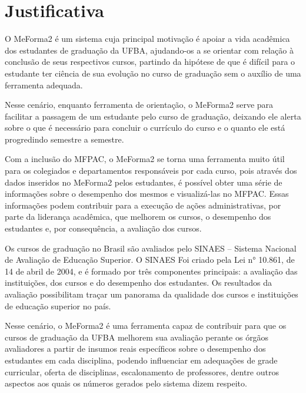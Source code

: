 \chapter{Justificativa}

O MeForma2 é um sistema cuja principal motivação é apoiar a vida acadêmica dos estudantes de graduação da UFBA, ajudando-os a se orientar com relação à conclusão de seus respectivos cursos, partindo da hipótese de que é difícil para o estudante ter ciência de sua evolução no curso de graduação sem o auxílio de uma ferramenta adequada. 

Nesse cenário, enquanto ferramenta de orientação, o MeForma2 serve para facilitar a passagem de um estudante pelo curso de graduação, deixando ele alerta sobre o que é necessário para concluir o currículo do curso e o quanto ele está progredindo semestre a semestre.

Com a inclusão do MFPAC, o MeForma2 se torna uma ferramenta muito útil para os colegiados e departamentos responsáveis por cada curso, pois através dos dados inseridos no MeForma2 pelos estudantes, é possível obter uma série de informações sobre o desempenho dos mesmos e visualizá-las no MFPAC. Essas informações podem contribuir para a execução de ações administrativas, por parte da liderança acadêmica, que melhorem os cursos, o desempenho dos estudantes e, por consequência, a avaliação dos cursos.

Os cursos de graduação no Brasil são avaliados pelo SINAES -- Sistema Nacional de Avaliação de Educação Superior. O SINAES Foi criado pela Lei n° 10.861, de 14 de abril de 2004, e é formado por três componentes principais: a avaliação das instituições, dos cursos e do desempenho dos estudantes. Os resultados da avaliação possibilitam traçar um panorama da qualidade dos cursos e instituições de educação superior no país.

Nesse cenário, o MeForma2 é uma ferramenta capaz de contribuir para que os cursos de graduação da UFBA melhorem sua avaliação perante os órgãos avaliadores a partir de insumos reais específicos sobre o desempenho dos estudantes em cada disciplina, podendo influenciar em adequações de grade curricular, oferta de disciplinas, escalonamento de professores, dentre outros aspectos aos quais os números gerados pelo sistema dizem respeito.